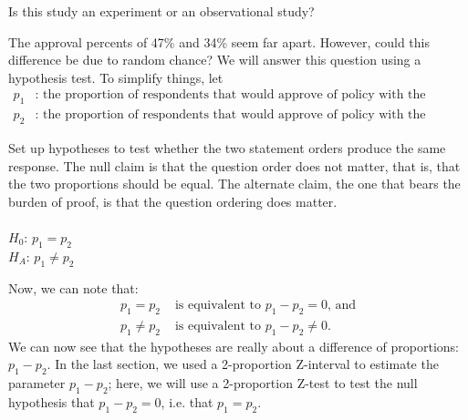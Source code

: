 \begin{exercisewrap}
\begin{nexercise}
Is this study an experiment or an observational study?\footnotemark
\end{nexercise}
\end{exercisewrap}

\noindent The approval percents of 47\% and 34\% seem far apart.  However, could this difference be due to random chance?  We will answer this question using a hypothesis test.  To simplify things, let 
\begin{align*}
p_1& \text{: the proportion of respondents that would approve of policy with the original statement ordering, and }\\
p_2& \text{: the proportion of respondents that would approve of policy with the reversed statement ordering.}
\end{align*}

\begin{examplewrap}
\begin{nexample}{Set up hypotheses to test whether the two statement orders produce the same response. }
The null claim is that the question order does not matter, that is, that the two proportions should be equal.  The alternate claim, the one that bears the burden of proof, is that the question ordering does matter.  \\
\\
$H_0$: $p_1 =  p_2$ \\ $H_A$: $p_1 \ne  p_2$
\end{nexample}
\end{examplewrap}

Now, we can note that:
\begin{align*}
p_1=p_2 &\text{ is equivalent to } p_1-p_2=0\text{, and} \\
p_1\ne p_2 &\text{ is equivalent to } p_1-p_2\ne 0.  
\end{align*}
We can now see that the hypotheses are really about a difference of proportions: $p_1-p_2$.  In the last section, we used a 2-proportion Z-interval to estimate the parameter $p_1-p_2$; here, we will use a 2-proportion Z-test to test the null hypothesis that $p_1-p_2=0$, i.e. that $p_1=p_2$.

